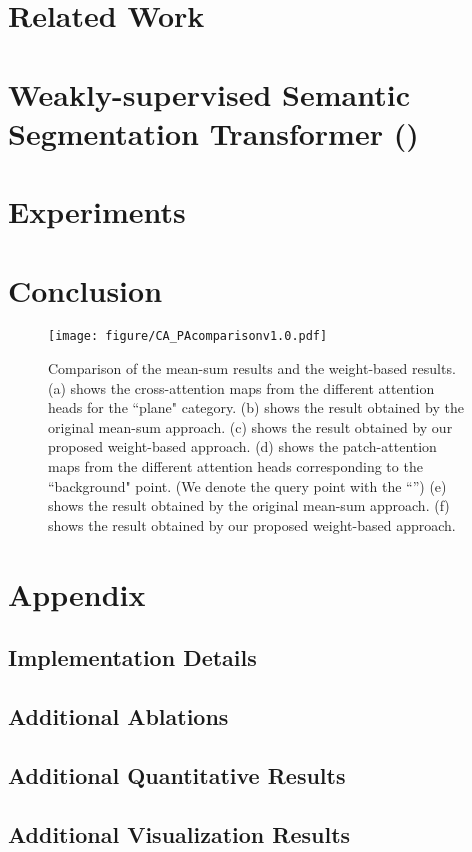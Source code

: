 \documentclass[10pt,twocolumn,letterpaper]{article}
\begin{document}
\section{Related Work}
\label{sec:relatedw}

\section{Weakly-supervised Semantic Segmentation Transformer (\name)}
\label{sec:method}

\section{Experiments}
\label{sec:experiments}

\section{Conclusion}
\label{sec:conclusion}


{\small


}

\newpage

\begin{figure*}[htp]
\centering
    \texttt{[image: figure/CA\_PAcomparisonv1.0.pdf]}
\caption{Comparison of the mean-sum results and the weight-based results. (a) shows the cross-attention maps from the different attention heads for the ``plane" category. (b) shows the result obtained by the original mean-sum approach. (c) shows the result obtained by our proposed weight-based approach. (d) shows the patch-attention maps from the different attention heads corresponding to the ``background" point. (We denote the query point with the ``'') (e) shows the result obtained by the original mean-sum approach. (f) shows the result obtained by our proposed weight-based approach.}
    \label{fig:attention_maps}
    
\end{figure*}

\appendix

\section{Appendix}


\subsection{Implementation Details}
\label{sec:imple}




\subsection{Additional Ablations}

\label{sec:ablation}

\subsection{Additional Quantitative Results}
\label{sec:results}

\subsection{Additional Visualization Results}
\label{sec:visual}

\end{document}
